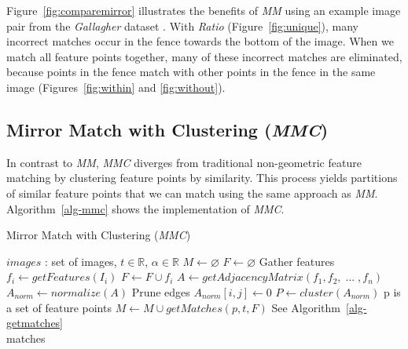 Figure~\ref{fig:comparemirror} illustrates the benefits of \emph{MM} 
using an example image pair from the \emph{Gallagher} dataset 
\cite{gallagher2008}.
With \emph{Ratio} (Figure~\ref{fig:unique}), many incorrect matches occur 
in the fence towards the bottom of the image.
When we match all feature points together, many of these incorrect 
matches are eliminated, because points in the fence match with other 
points in the fence in the same image (Figures~\ref{fig:within} and
\ref{fig:without}).


\subsection{Mirror Match with Clustering (\emph{MMC})}

In contrast to \emph{MM}, \emph{MMC} diverges from traditional 
non-geometric feature matching by clustering feature points by 
similarity. This process yields partitions of similar feature points 
that we can match using the same approach as \emph{MM}.  
Algorithm~\ref{alg-mmc} shows the implementation of \emph{MMC}.

\begin{algorithm}[htb]
\caption{Mirror Match with Clustering (\emph{MMC})}
\label{alg-mmc}
\begin{algorithmic}
\Require $images$ : set of images, $t \in \mathbb{R}$, $\alpha \in 
\mathbb{R}$
\State $M\gets \varnothing$
\State $F\gets \varnothing$
 \Comment Gather features
	\State $f_i\gets getFeatures(I_i)$
	\State $F\gets F \cup f_i$
\EndFor
\State $A\gets getAdjacencyMatrix(f_1, f_2,\; \ldots \;, f_n)$
\State $A_{norm}\gets normalize(A)$
 \Comment Prune edges
        \State $A_{norm}[i,j] \gets 0$
    \EndIf
\EndFor
\State $P\gets cluster(A_{norm})$
 \Comment p is a set of feature points
    \State $M\gets M \cup getMatches(p, t, F)$ \Comment See 
    Algorithm~\ref{alg-getmatches}
\EndFor \\
\Return matches
\end{algorithmic}
\end{algorithm}


